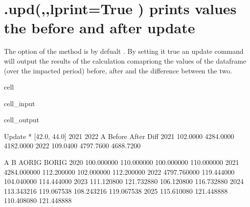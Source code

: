 \documentclass[letterpaper,10pt,english]{jupyterBook}
\begin{document}
\section{.upd(,,lprint=True ) prints values the before and after update}
\label{\detokenize{content/04_PythonEssentials/UpdateCommand:upd-lprint-true-prints-values-the-before-and-after-update}}
\sphinxAtStartPar
The  option of the method  is by defualt .  By setting it true an update command will output the results of the calculation comapriong the values of the dataframe (over the impacted period) before, after and the difference between the two.

\begin{sphinxuseclass}{cell}\begin{sphinxVerbatimInput}

\begin{sphinxuseclass}{cell_input}
\begin{sphinxVerbatim}[commandchars=\\\{\}]
\end{sphinxVerbatim}

\end{sphinxuseclass}\end{sphinxVerbatimInput}
\begin{sphinxVerbatimOutput}

\begin{sphinxuseclass}{cell_output}
\begin{sphinxVerbatim}[commandchars=\\\{\}]
Update * [42.0, 44.0] 2021 2022
A                    Before                After                 Diff
2021               102.0000            4284.0000            4182.0000
2022               109.0400            4797.7600            4688.7200
\end{sphinxVerbatim}

\begin{sphinxVerbatim}[commandchars=\\\{\}]
                A           B      A\PYGZus{}ORIG      B\PYGZus{}ORIG
2020   100.000000  110.000000  100.000000  110.000000
2021  4284.000000  112.200000  102.000000  112.200000
2022  4797.760000  119.444000  104.040000  114.444000
2023   111.120800  121.732880  106.120800  116.732880
2024   113.343216  119.067538  108.243216  119.067538
2025   115.610080  121.448888  110.408080  121.448888
\end{sphinxVerbatim}

\end{sphinxuseclass}\end{sphinxVerbatimOutput}

\end{sphinxuseclass}
\end{document}

